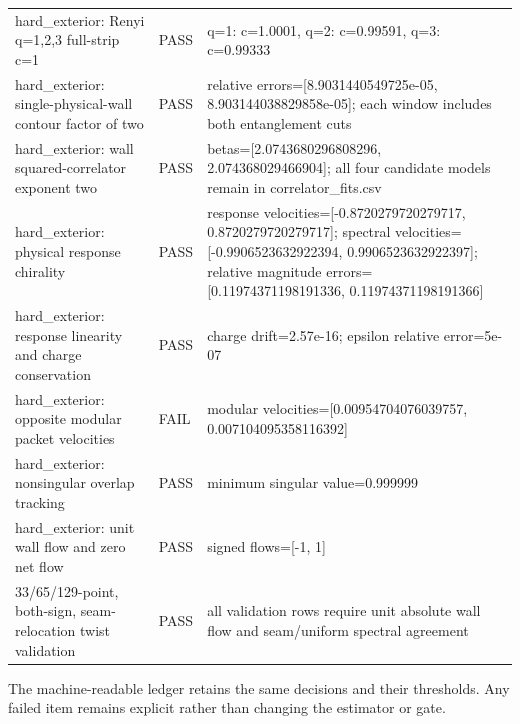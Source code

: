 \documentclass[aps,prb,onecolumn,nofootinbib,superscriptaddress]{revtex4-2}
\begin{document}
\begin{longtable}{p{}p{}p{}}
hard\_exterior: Renyi q=1,2,3 full-strip c=1 & PASS & q=1: c=1.0001, q=2: c=0.99591, q=3: c=0.99333 \\
hard\_exterior: single-physical-wall contour factor of two & PASS & relative errors=[8.9031440549725e-05, 8.903144038829858e-05]; each window includes both entanglement cuts \\
hard\_exterior: wall squared-correlator exponent two & PASS & betas=[2.0743680296808296, 2.074368029466904]; all four candidate models remain in correlator\_fits.csv \\
hard\_exterior: physical response chirality & PASS & response velocities=[-0.8720279720279717, 0.8720279720279717]; spectral velocities=[-0.9906523632922394, 0.9906523632922397]; relative magnitude errors=[0.11974371198191336, 0.11974371198191366] \\
hard\_exterior: response linearity and charge conservation & PASS & charge drift=2.57e-16; epsilon relative error=5e-07 \\
hard\_exterior: opposite modular packet velocities & FAIL & modular velocities=[0.00954704076039757, 0.007104095358116392] \\
hard\_exterior: nonsingular overlap tracking & PASS & minimum singular value=0.999999 \\
hard\_exterior: unit wall flow and zero net flow & PASS & signed flows=[-1, 1] \\
33/65/129-point, both-sign, seam-relocation twist validation & PASS & all validation rows require unit absolute wall flow and seam/uniform spectral agreement \\
\bottomrule
\end{longtable}
The machine-readable ledger retains the same decisions and their thresholds.  Any failed
item remains explicit rather than changing the estimator or gate.
\end{document}
